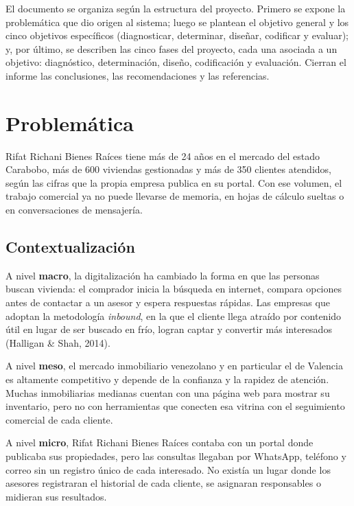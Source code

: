 \documentclass[stu,12pt,letterpaper,donotrepeattitle,floatsintext]{apa7}
\begin{document}
El documento se organiza según la estructura del proyecto. Primero se expone la problemática que dio origen al sistema; luego se plantean el objetivo general y los cinco objetivos específicos (diagnosticar, determinar, diseñar, codificar y evaluar); y, por último, se describen las cinco fases del proyecto, cada una asociada a un objetivo: diagnóstico, determinación, diseño, codificación y evaluación. Cierran el informe las conclusiones, las recomendaciones y las referencias.

\section{Problemática}

Rifat Richani Bienes Raíces tiene más de 24 años en el mercado del estado Carabobo, más de 600 viviendas gestionadas y más de 350 clientes atendidos, según las cifras que la propia empresa publica en su portal. Con ese volumen, el trabajo comercial ya no puede llevarse de memoria, en hojas de cálculo sueltas o en conversaciones de mensajería.

\subsection{Contextualización}

A nivel \textbf{macro}, la digitalización ha cambiado la forma en que las personas buscan vivienda: el comprador inicia la búsqueda en internet, compara opciones antes de contactar a un asesor y espera respuestas rápidas. Las empresas que adoptan la metodología \textit{inbound}, en la que el cliente llega atraído por contenido útil en lugar de ser buscado en frío, logran captar y convertir más interesados (Halligan \& Shah, 2014).

A nivel \textbf{meso}, el mercado inmobiliario venezolano y en particular el de Valencia es altamente competitivo y depende de la confianza y la rapidez de atención. Muchas inmobiliarias medianas cuentan con una página web para mostrar su inventario, pero no con herramientas que conecten esa vitrina con el seguimiento comercial de cada cliente.

A nivel \textbf{micro}, Rifat Richani Bienes Raíces contaba con un portal donde publicaba sus propiedades, pero las consultas llegaban por WhatsApp, teléfono y correo sin un registro único de cada interesado. No existía un lugar donde los asesores registraran el historial de cada cliente, se asignaran responsables o midieran sus resultados.
\end{document}
